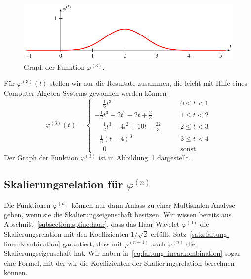 \begin{beispiel}
\begin{figure}
\centering
\includegraphics{chapters/9-spline/images/phi3.pdf}
\caption{Graph der Funktion $\varphi^{(3)}$.
\label{spline:phi3}}
\end{figure}
Für $\varphi^{(3)}(t)$ stellen wir nur die Resultate
zusammen, die leicht mit Hilfe eines Computer-Algebra-Systems
gewonnen werden können:
\begin{equation}
\varphi^{(3)}(t)
=
\begin{cases}
\displaystyle
\phantom{-}
\frac16t^3
&\qquad
0\le t<1
\\[9pt]
\displaystyle
-\frac12t^3+2t^2-2t+\frac23
&\qquad
1\le t<2
\\[9pt]
\displaystyle
\phantom{-}
\frac12t^3-4t^2+10t-\frac{22}3
&\qquad
2\le t<3
\\[9pt]
\displaystyle
-\frac16(t-4)^3
&\qquad
3\le t<4
\\[9pt]
\displaystyle
\phantom{-}
0&\qquad\text{sonst}
\end{cases}
\end{equation}
Der Graph der Funktion $\varphi^{(3)}$ ist in Abbildung~\ref{spline:phi3}
dargestellt.
\end{beispiel}

\subsection{Skalierungsrelation für $\varphi^{(n)}$
\label{subsection:skalierungsrelation-phin}}
Die Funktionen $\varphi^{(n)}$ können nur dann Anlass zu einer
Multiskalen-Analyse geben, wenn sie die Skalierungseigenschaft
besitzen.
Wir wissen bereits aus Abschnitt~\ref{subsection:spline:haar},
dass das Haar-Wavelet $\varphi^{(0)}$ die Skalierungsrelation
mit den Koeffizienten $1/\sqrt{2}$ erfüllt.
Satz~\ref{satz:faltung-linearkombination} garantiert, dass mit
$\varphi^{(n-1)}$ auch $\varphi^{(n)}$ die Skalierungseigenschaft hat.
Wir haben in~\eqref{eq:faltung-linearkombination}
sogar eine Formel, mit der wir die Koeffizienten der Skalierungsrelation
berechnen können.


